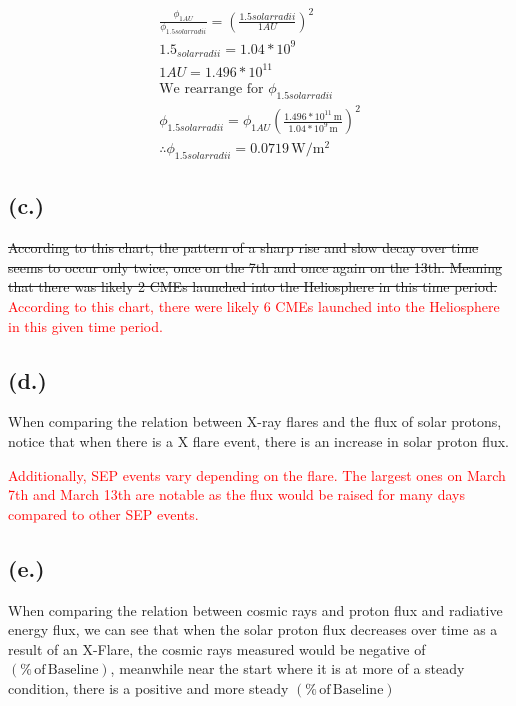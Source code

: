 \documentclass[11pt]{article}
\begin{document}
\[
\begin{gathered}
\frac{\phi_{1AU}}{\phi_{1.5 solar radii}} = (\frac{1. 5solar radii}{1AU})^2 \\
1.5_{solarradii} = 1.04*10^9 \\
1AU = 1.496*10^11 \\
\text{We rearrange for } \phi_{1.5 solar radii} \\
\phi_{1.5 solar radii} = \phi_{1AU}(\frac{1.496*10^11 \, \mathrm{m}}{1.04*10^9 \, \mathrm{m}})^2 \\
\boxed{\therefore \phi_{1.5 solar radii} = 0.0719 \, \mathrm{W/m^2}}
\end{gathered}
\]

\subsection*{{(c.)}}
\sout{According to this chart, the pattern of a sharp rise and
slow decay over time seems to occur only twice, once on the 7th
and once again on the 13th. Meaning that there was likely 2 CMEs
launched into the Heliosphere in this time period.}
\textcolor{red}{According to this chart, there were likely 6 CMEs launched
into the Heliosphere in this given time period.}



\subsection*{{(d.)}}
When comparing the relation between X-ray flares and the flux of
solar protons, notice that when there is a X flare event, there is 
an increase in solar proton flux. 

\textcolor{red}{Additionally, SEP events vary depending on the flare. The largest
ones on March 7th and March 13th are notable as the flux would be raised for many
days compared to other SEP events.}

\subsection*{{(e.)}}
When comparing the relation between cosmic rays and proton flux and
radiative energy flux, we can see that when the solar proton flux decreases
over time as a result of an X-Flare, the cosmic rays measured would be negative
of $(\mathrm{\% \, of\, Baseline})$, meanwhile near the start where it is at more of a 
steady condition, there is a positive and more steady $(\mathrm{\% \, of \, Baseline})$
\end{document}
